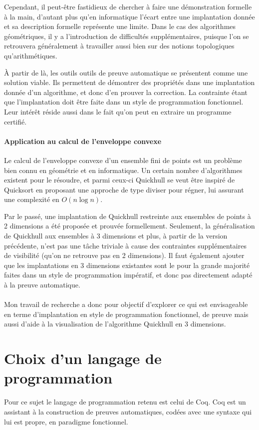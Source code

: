 \documentclass[]{article}
\begin{document}
Cependant, il peut-être fastidieux de chercher à faire une démonstration formelle à la main, d'autant plus qu'en informatique l'écart entre une implantation donnée et sa description formelle représente une limite. Dans le cas des algorithmes géométriques, il y a l'introduction de difficultés supplémentaires, puisque l'on se retrouvera généralement à travailler aussi bien sur des notions topologiques qu'arithmétiques.

À partir de là, les outils outils de preuve automatique se présentent comme une solution viable. Ils permettent de démontrer des propriétés dans une implantation donnée d'un algorithme, et donc d'en prouver la correction. La contrainte étant que l'implantation doit être faite dans un style de programmation fonctionnel. Leur intérêt réside aussi dans le fait qu'on peut en extraire un programme certifié.

\paragraph{Application au calcul de l'enveloppe convexe}
Le calcul de l'enveloppe convexe d'un ensemble fini de points est un problème bien connu en géométrie et en informatique. Un certain nombre d'algorithmes existent pour le résoudre, et parmi ceux-ci Quickhull se veut être inspiré de Quicksort en proposant une approche de type diviser pour régner, lui assurant une complexité en $O(n\log{}n)$.

Par le passé, une implantation de Quickhull restreinte aux ensembles de points à 2 dimensions a été proposée et prouvée formellement. Seulement, la généralisation de Quickhull aux ensembles à 3 dimensions et plus, à partir de la version précédente, n'est pas une tâche triviale à cause des contraintes supplémentaires de visibilité (qu'on ne retrouve pas en 2 dimensions). Il faut également ajouter que les implantations en 3 dimensions existantes sont le pour la grande majorité faites dans un style de programmation impératif, et donc pas directement adapté à la preuve automatique.

\paragraph{}
Mon travail de recherche a donc pour objectif d'explorer ce qui est envisageable en terme d'implantation en style de programmation fonctionnel, de preuve mais aussi d'aide à la visualisation de l'algorithme Quickhull en 3 dimensions.

\section{Choix d'un langage de programmation}
Pour ce sujet le langage de programmation retenu est celui de Coq. Coq est un assistant à la construction de preuves automatiques, codées avec une syntaxe qui lui est propre, en paradigme fonctionnel.
\end{document}
